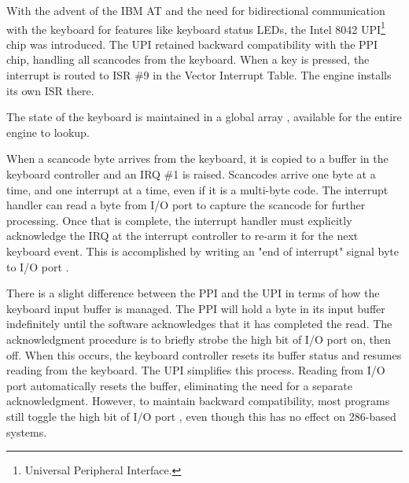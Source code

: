 \documentclass[book.tex]{subfiles}
\begin{document}
\par
With the advent of the IBM AT and the need for bidirectional communication with the keyboard for features like keyboard status LEDs, the Intel 8042 UPI\footnote{Universal Peripheral Interface.} chip was introduced. The UPI retained backward compatibility with the PPI chip, handling all scancodes from the keyboard. When a key is pressed, the interrupt is routed to ISR \#9 in the Vector Interrupt Table. The engine installs its own ISR there.\\


\par
\begin{minipage}{\textwidth}

\end{minipage}

\par
The state of the keyboard is maintained in a global array , available for the entire engine to lookup.\\
\par
\begin{minipage}{\textwidth}

\end{minipage}

\par
When a scancode byte arrives from the keyboard, it is copied to a buffer in the keyboard controller and an IRQ \#1 is raised. Scancodes arrive one byte at a time, and one interrupt at a time, even if it is a multi-byte code. The interrupt handler can read a byte from I/O port  to capture the scancode for further processing. Once that is complete, the interrupt handler must explicitly acknowledge the IRQ at the interrupt controller to re-arm it for the next keyboard event. This is accomplished by writing an "end of interrupt" signal byte to I/O port . \\

\par
There is a slight difference between the PPI and the UPI in terms of how the keyboard input buffer is managed. The PPI will hold a byte in its input buffer indefinitely until the software acknowledges that it has completed the read. The acknowledgment procedure is to briefly strobe the high bit of I/O port  on, then off. When this occurs, the keyboard controller resets its buffer status and resumes reading from the keyboard. The UPI simplifies this process. Reading from I/O port  automatically resets the buffer, eliminating the need for a separate acknowledgment. However, to maintain backward compatibility, most programs still toggle the high bit of I/O port , even though this has no effect on 286-based systems.\\

\par
\begin{minipage}{\textwidth}

\end{minipage}
\end{document}
